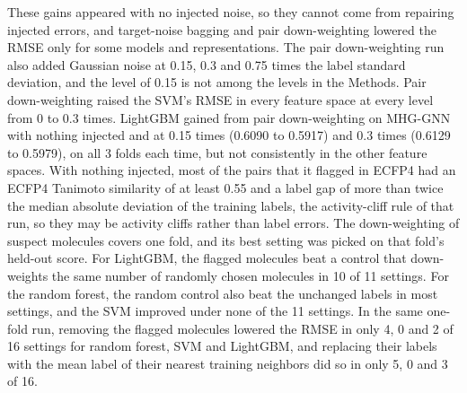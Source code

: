 These gains appeared with no injected noise, so they cannot come from repairing injected errors, and target-noise bagging and pair down-weighting lowered the RMSE only for some models and representations. The pair down-weighting run also added Gaussian noise at 0.15, 0.3 and 0.75 times the label standard deviation, and the level of 0.15 is not among the levels in the Methods. Pair down-weighting raised the SVM's RMSE in every feature space at every level from 0 to 0.3 times. LightGBM gained from pair down-weighting on MHG-GNN with nothing injected and at 0.15 times (0.6090 to 0.5917) and 0.3 times (0.6129 to 0.5979), on all 3 folds each time, but not consistently in the other feature spaces. With nothing injected, most of the pairs that it flagged in ECFP4 had an ECFP4 Tanimoto similarity of at least 0.55 and a label gap of more than twice the median absolute deviation of the training labels, the activity-cliff rule of that run, so they may be activity cliffs rather than label errors. The down-weighting of suspect molecules covers one fold, and its best setting was picked on that fold's held-out score. For LightGBM, the flagged molecules beat a control that down-weights the same number of randomly chosen molecules in 10 of 11 settings. For the random forest, the random control also beat the unchanged labels in most settings, and the SVM improved under none of the 11 settings. In the same one-fold run, removing the flagged molecules lowered the RMSE in only 4, 0 and 2 of 16 settings for random forest, SVM and LightGBM, and replacing their labels with the mean label of their nearest training neighbors did so in only 5, 0 and 3 of 16.

